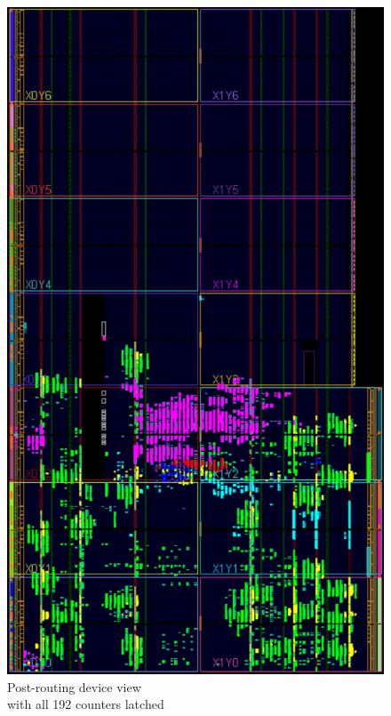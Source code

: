 \begin{figure}[H]
\begin{minipage}{.5\textwidth}
		\includegraphics[width=.85\linewidth]{IMG/ch4/routed_colored_perfect}
		\caption{Post-routing device view\\ with all 192 counters latched}
		\label{fig:allcounters}
	\end{minipage}
\end{figure}
